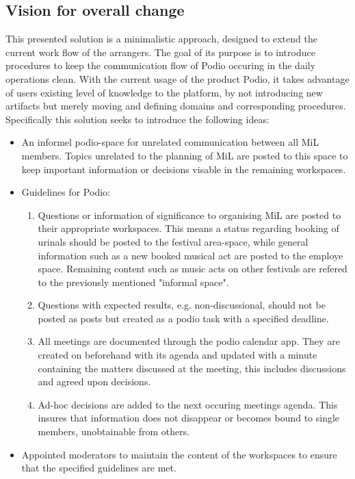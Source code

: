 \subsection{Vision for overall change} 
This presented solution is a minimalistic approach, designed to extend the current work flow of the arrangers. The goal of its purpose is to introduce procedures to keep the communication flow of Podio occuring in the daily operations clean. With the current usage of the product Podio, it takes advantage of users existing level of knowledge to the platform, by not introducing new artifacts but merely moving and defining domains and corresponding procedures. Specifically this solution seeks to introduce the following ideas:

\begin{itemize}
    \item An informel podio-space for unrelated communication between all MiL members. Topics unrelated to the planning of MiL are posted to this space to keep important information or decisions visable in the remaining workspaces.
    \item Guidelines for Podio:
    \begin{enumerate}
        \item Questions or information of significance to organising MiL are posted to their appropriate workspaces. This means a status regarding booking of urinals should be posted to the festival area-space, while general information such as a new booked musical act are posted to the employe space. Remaining content such as music acts on other festivals are refered to the previously mentioned "informal space".
        \item Questions with expected results, e.g. non-discussional, should not be posted as posts but created as a podio task with a specified deadline. 
        \item All meetings are documented through the podio calendar app. They are created on beforehand with its agenda and updated with a minute containing the matters discussed at the meeting, this includes discussions and agreed upon decisions.
        \item Ad-hoc decisions are added to the next occuring meetings agenda. This insures that information does not disappear or becomes bound to single members, unobtainable from others.
    \end{enumerate}
    \item Appointed moderators to maintain the content of the workspaces to ensure that the specified guidelines are met.
\end{itemize}

